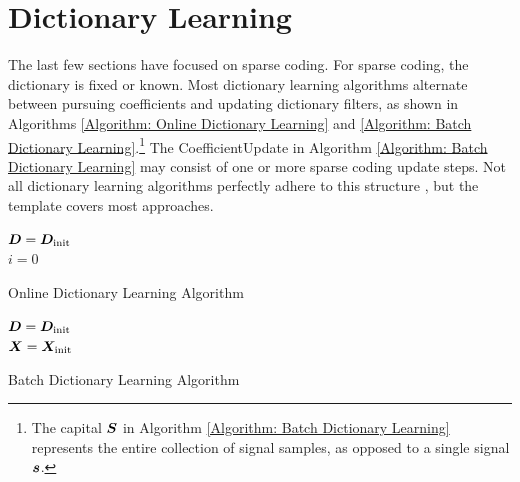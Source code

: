 \section{Dictionary Learning}
The last few sections have focused on sparse coding. For sparse coding, the dictionary is fixed or known. Most dictionary learning algorithms alternate between pursuing coefficients and updating dictionary filters, as shown in Algorithms \ref{Algorithm: Online Dictionary Learning} and \ref{Algorithm: Batch Dictionary Learning}.\footnote{The capital $\bm{S}$ in Algorithm \ref{Algorithm: Batch Dictionary Learning} represents the entire collection of signal samples, as opposed to a single signal $\bm{s}$.} The CoefficientUpdate in Algorithm \ref{Algorithm: Batch Dictionary Learning} may consist of one or more sparse coding update steps. Not all dictionary learning algorithms perfectly adhere to this structure \cite{aharon2006k}, but the template covers most approaches.
\begin{algorithm}[h] 
\SetAlgoLined
   $\bm{D} = \bm{D}_{\text{init}}$ \\
   $i = 0$
 \caption{Online Dictionary Learning Algorithm}\label{Algorithm: Online Dictionary Learning}
\end{algorithm}
\begin{algorithm}[h] 
\SetAlgoLined
   $\bm{D} = \bm{D}_{\text{init}}$ \\
   $\bm{X} = \bm{X}_{\text{init}}$ \\
 \caption{Batch Dictionary Learning Algorithm}\label{Algorithm: Batch Dictionary Learning}
\end{algorithm}

